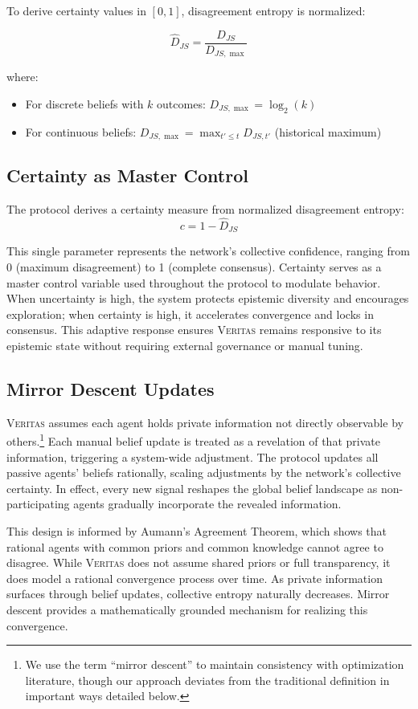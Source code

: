 \documentclass[11pt,a4paper]{article}
\newcommand{\veritas}{\textsc{Veritas}}
\begin{document}
To derive certainty values in $[0,1]$, disagreement entropy is normalized:

$$\hat{D}_{JS} = \frac{D_{JS}}{D_{JS,\max}}$$

where:
\begin{itemize}
\item For discrete beliefs with $k$ outcomes: $D_{JS,\max} = \log_2(k)$
\item For continuous beliefs: $D_{JS,\max} = \max_{t' \leq t} D_{JS,t'}$ (historical maximum)
\end{itemize}

\subsection{Certainty as Master Control}

The protocol derives a certainty measure from normalized disagreement entropy:
$$c = 1 - \hat{D}_{JS}$$

This single parameter represents the network's collective confidence, ranging from 0 (maximum disagreement) to 1 (complete consensus). Certainty serves as a master control variable used throughout the protocol to modulate behavior. When uncertainty is high, the system protects epistemic diversity and encourages exploration; when certainty is high, it accelerates convergence and locks in consensus. This adaptive response ensures \veritas{} remains responsive to its epistemic state without requiring external governance or manual tuning.

\subsection{Mirror Descent Updates}

\veritas{} assumes each agent holds private information not directly observable by others.\footnote{We use the term ``mirror descent'' to maintain consistency with optimization literature, though our approach deviates from the traditional definition in important ways detailed below.} Each manual belief update is treated as a revelation of that private information, triggering a system-wide adjustment. The protocol updates all passive agents' beliefs rationally, scaling adjustments by the network's collective certainty. In effect, every new signal reshapes the global belief landscape as non-participating agents gradually incorporate the revealed information.

This design is informed by Aumann's Agreement Theorem, which shows that rational agents with common priors and common knowledge cannot agree to disagree. While \veritas{} does not assume shared priors or full transparency, it does model a rational convergence process over time. As private information surfaces through belief updates, collective entropy naturally decreases. Mirror descent provides a mathematically grounded mechanism for realizing this convergence.
\end{document}
